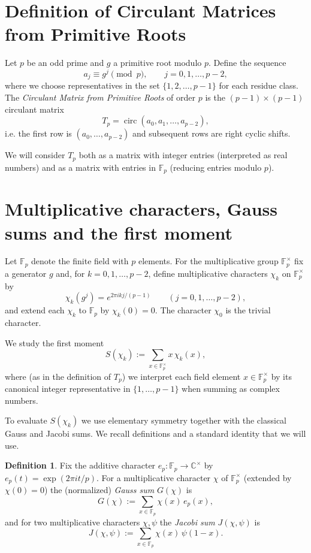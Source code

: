 \documentclass[11pt,a4paper]{article}
\theoremstyle{plain}
\theoremstyle{definition}
\newtheorem{definition}{Definition}
\begin{document}
\section{Definition of Circulant Matrices from Primitive Roots}
Let $p$ be an odd prime and $g$ a primitive root modulo $p$. Define the sequence
\[
a_j \equiv g^j \pmod p,\qquad j=0,1,\dots,p-2,
\]
where we choose representatives in the set $\{1,2,\dots,p-1\}$ for each residue class. The \emph{Circulant Matrix from Primitive Roots} of order $p$ is the $(p-1)\times(p-1)$ circulant matrix
\[
T_p=\operatorname{circ}(a_0,a_1,\dots,a_{p-2}),
\]
i.e. the first row is $(a_0,\dots,a_{p-2})$ and subsequent rows are right cyclic shifts.

We will consider $T_p$ both as a matrix with integer entries (interpreted as real numbers) and as a matrix with entries in $\mathbb{F}_p$ (reducing entries modulo $p$).

\section{Multiplicative characters, Gauss sums and the first moment}
\label{sec:gauss}

Let $\mathbb{F}_p$ denote the finite field with $p$ elements. For the multiplicative group $\mathbb{F}_p^\times$ fix a generator $g$ and, for $k=0,1,\dots,p-2$, define multiplicative characters $\chi_k$ on $\mathbb{F}_p^\times$ by
\[
\chi_k(g^j)=e^{2\pi i k j/(p-1)}\qquad (j=0,1,\dots,p-2),
\]
and extend each $\chi_k$ to $\mathbb{F}_p$ by $\chi_k(0)=0$. The character $\chi_0$ is the trivial character.

We study the first moment
\[
S(\chi_k):=\sum_{x\in\mathbb{F}_p^\times} x\,\chi_k(x),
\]
where (as in the definition of $T_p$) we interpret each field element $x\in\mathbb{F}_p^\times$ by its canonical integer representative in $\{1,\dots,p-1\}$ when summing as complex numbers.

To evaluate $S(\chi_k)$ we use elementary symmetry together with the classical Gauss and Jacobi sums. We recall definitions and a standard identity that we will use.

\begin{definition}
Fix the additive character $e_p:\mathbb{F}_p\to\mathbb{C}^\times$ by $e_p(t)=\exp(2\pi i t/p)$. 
For a multiplicative character $\chi$ of $\mathbb{F}_p^\times$ (extended by $\chi(0)=0$) the (normalized) \emph{Gauss sum} $G(\chi)$ is
\[
G(\chi):=\sum_{x\in\mathbb{F}_p} \chi(x)\,e_p(x),
\]
and for two multiplicative characters $\chi,\psi$ the \emph{Jacobi sum} $J(\chi,\psi)$ is
\[
J(\chi,\psi):=\sum_{x\in\mathbb{F}_p} \chi(x)\,\psi(1-x).
\]
\end{definition}
\end{document}
